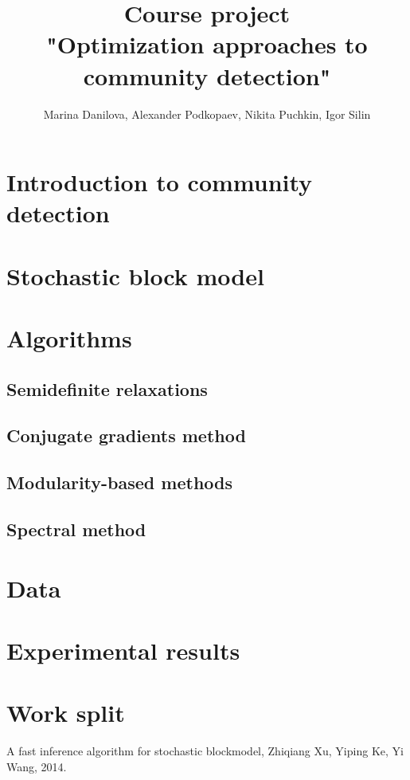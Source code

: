 \documentclass[11pt,a4paper]{extarticle}
\title{Course project \\
"Optimization approaches to community detection"}
\author{ Marina Danilova, Alexander Podkopaev, Nikita Puchkin, Igor Silin }
\begin{document}
\maketitle

\section{Introduction to community detection}

\section{Stochastic block model}

\section{Algorithms}
	
	\subsection{Semidefinite relaxations}
	\subsection{Conjugate gradients method}
	\subsection{Modularity-based methods}
	\subsection{Spectral method}

\section{Data}

\section{Experimental results}

\section{Work split}



\renewcommand{\refname}{References}
\begin{thebibliography}{9}
    A fast inference algorithm for stochastic blockmodel, Zhiqiang Xu, Yiping Ke, Yi Wang, 2014. \\
\end{thebibliography}
\end{document}
